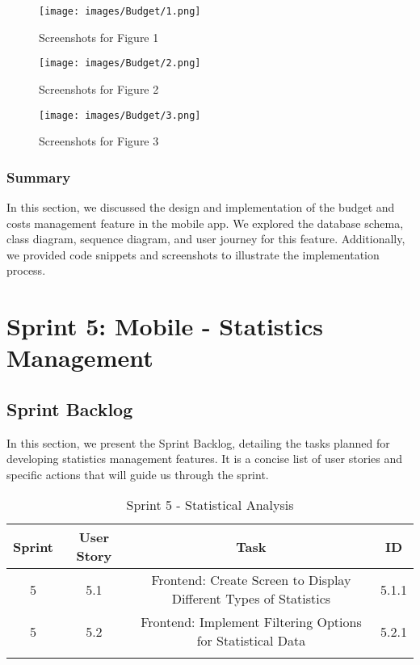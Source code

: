 \begin{figure}[H]
    \centering
    \texttt{[image: images/Budget/1.png]}
    \caption{Screenshots for Figure 1}
    \label{fig:screenshots_figure1}
\end{figure}

\begin{figure}[H]
    \centering
    \texttt{[image: images/Budget/2.png]}
    \caption{Screenshots for Figure 2}
    \label{fig:screenshots_figure2}
\end{figure}

\begin{figure}[H]
    \centering
    \texttt{[image: images/Budget/3.png]}
    \caption{Screenshots for Figure 3}
    \label{fig:screenshots_figure3}
\end{figure}

\subsubsection{Summary}

In this section, we discussed the design and implementation of the budget and costs management feature in the mobile app. We explored the database schema, class diagram, sequence diagram, and user journey for this feature. Additionally, we provided code snippets and screenshots to illustrate the implementation process.

\section{Sprint 5: Mobile - Statistics Management}

\subsection{Sprint Backlog}

In this section, we present the Sprint Backlog, detailing the tasks planned for developing statistics management features. It is a concise list of user stories and specific actions that will guide us through the sprint.

\setlength{\LTleft}{0pt}
\begin{longtable}{|c|c|c|c|}
\hline
\textbf{Sprint} & \textbf{User Story} & \textbf{Task} & \textbf{ID} \\
\hline
5 & 5.1 & Frontend: Create Screen to Display Different Types of Statistics & 5.1.1 \\
\hline
5 & 5.2 & Frontend: Implement Filtering Options for Statistical Data & 5.2.1 \\
\hline
\caption{Sprint 5 - Statistical Analysis}
\label{tab:sprint5_backlog}
\end{longtable}

